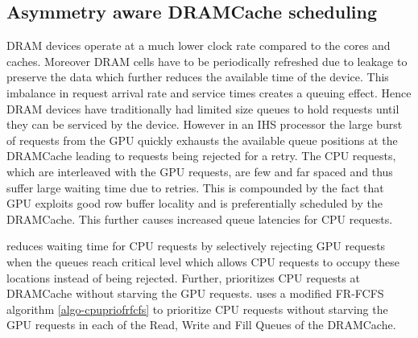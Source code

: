 \subsection{Asymmetry aware DRAMCache scheduling}
DRAM devices operate at a much lower clock rate compared to the cores and caches. Moreover DRAM cells have to be periodically refreshed due to leakage to preserve the data which further reduces the available time of the device. This imbalance in request arrival rate and service times creates a queuing effect. Hence DRAM devices have traditionally had limited size queues to hold requests until they can be serviced by the device. However in an IHS processor the large burst of requests from the GPU quickly exhausts the available queue positions at the DRAMCache  leading to requests being rejected for a retry. The CPU requests, which are interleaved with the GPU requests, are few and far spaced and thus suffer large waiting time due to retries. This is compounded by the fact that GPU exploits good row buffer locality and is preferentially scheduled by the DRAMCache. This further causes increased queue latencies for CPU requests.
\par \cachename reduces waiting time for CPU requests by selectively rejecting GPU requests when the queues reach critical level which allows CPU requests to occupy these locations instead of being rejected. Further, \cachename prioritizes CPU requests at DRAMCache without starving the GPU requests. \cachename uses a modified FR-FCFS algorithm \ref{algo-cpupriofrfcfs} to prioritize CPU requests without starving the GPU requests in each of the Read, Write and Fill Queues of the DRAMCache.


